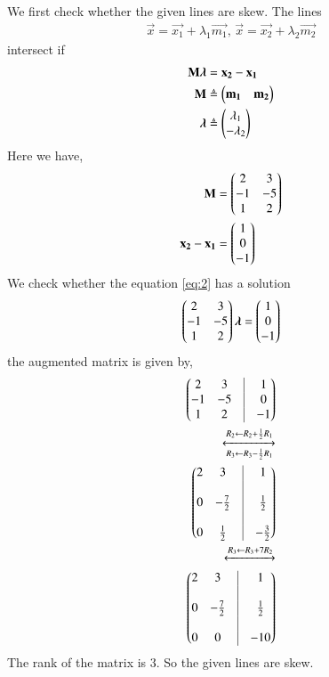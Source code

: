 \documentclass[journal,12pt,twocolumn]{IEEEtran}
\begin{document}
\begin{enumerate}
We first check whether the given lines are skew. The lines 
\begin{align}
\vec{x} = \vec{x_1} + \lambda_1\vec{m_1},\, \vec{x} = \vec{x_2} + \lambda_2\vec{m_2} 
\label{eq:1}
\end{align}
intersect if
\begin{align}
\mathbf{M}\bm{\lambda} &= \mathbf{x_2} - \mathbf{x_1}\\
\mathbf{M} &\triangleq \begin{pmatrix}\mathbf{m_1} & \mathbf{m_2}\end{pmatrix} \\
\bm{\lambda} &\triangleq \begin{pmatrix}\lambda_1\\-\lambda_2\end{pmatrix}\\
\end{align}
Here we have,
\begin{align}
\mathbf{M} &= \begin{pmatrix}2&3\\-1&-5\\1&2\end{pmatrix}\\
\mathbf{x_2} - \mathbf{x_1} &= \begin{pmatrix}1\\0\\-1\end{pmatrix}
\end{align}
We check whether the equation \eqref{eq:2} has a solution
\begin{align}
\begin{pmatrix}2&3\\-1&-5\\1&2\end{pmatrix}\bm{\lambda} = \begin{pmatrix}1\\0\\-1\end{pmatrix}
\label{eq:2}
\end{align}
the augmented matrix is given by,
\begin{align}
\myvec{2&3&\vrule&1\\-1&-5&\vrule&0\\1&2&\vrule&-1}\\
\xleftrightarrow[R_3 \leftarrow R_3 - \frac{1}{2}R_1]{R_2 \leftarrow R_2 + \frac{1}{2}R_1}\\
\myvec{2&3&\vrule&1\\&&\vrule\\0&-\frac{7}{2}&\vrule&\frac{1}{2}\\&&\vrule\\0&\frac{1}{2}&\vrule&-\frac{3}{2}}\\
\xleftrightarrow{R_3 \leftarrow R_3 + 7R_2}\\
\myvec{2&3&\vrule&1\\&&\vrule\\0&-\frac{7}{2}&\vrule&\frac{1}{2}\\&&\vrule\\0&0&\vrule&-10}
\end{align}
The rank of the matrix is 3. So the given lines are skew.

\end{enumerate}
\end{document}
